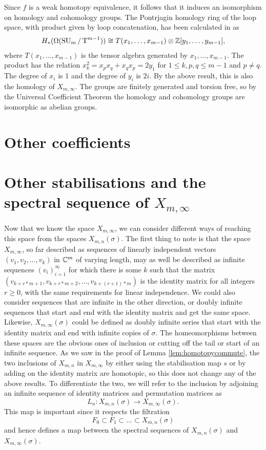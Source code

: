 Since $f$ is a weak homotopy equivalence, it follows that it induces
an isomorphism on homology and cohomology groups. The Pontrjagin
homology ring of the loop space, with product given by loop
concatenation, has been calculated in \cite[Theorem~4.1]{grbic} as
\begin{align*}
  H_*(\Omega(\operatorname{SU}_{m}/\operatorname{T}^{m-1})) \cong T(x_1,\dots,x_{m-1}) \otimes
  \mathbb{Z}[y_1,\dots,y_{m-1}],
\end{align*}
where $T(x_1,\dots,x_{m-1})$ is the tensor algebra generated by
$x_1,\dots,x_{m-1}$. The product has the relation $x_k^2 =
x_px_q+x_qx_p = 2y_1$ for $1\leq k,p,q\leq m-1$ and $p\neq q$. The
degree of $x_i$ is 1 and the degree of $y_i$
is $2i$. By the above result, this is also the homology of
$X_{m,\infty}$. The groups are finitely generated and torsion free, so
by the Universal Coefficient Theorem the homology and cohomology
groups are isomorphic as abelian groups.



\section{Other coefficients}
\label{sec:coef}


\section{Other stabilisations and the spectral sequence of
  $X_{m,\infty}$}

Now that we know the space $X_{m,\infty}$, we can consider different
ways of reaching this space from the spaces $X_{m,n}(\sigma)$. The
first thing to note is that the space $X_{m,\infty}$, so far described
as sequences of linearly independent vectors $(v_1,v_2,\dots,v_k)$ in
$\mathbb{C}^m$ of varying length, may as well be described as infinite
sequences $(v_i)_{i=1}^\infty$ for which there is some $k$ such that
the matrix $(v_{k+r*m +1},v_{k+r*m +2},\dots,v_{k+(r+1)*m})$ is the
identity matrix for all integers $r \geq 0$, with the same
requirements for
linear independence. We could also consider sequences that are
infinite in the other direction, or
doubly infinite sequences
that start and end with the identity matrix
and get the same space. Likewise, $X_{m,\infty}(\sigma)$ could be
defined as doubly infinite series that start with the identity matrix
and end with infinite copies of $\sigma$. The homeomorphisms between
these spaces are the obvious ones of inclusion or cutting off the tail
or start of an infinite sequence. As we saw in the proof of Lemma
\ref{lem:homotopycommute}, the two inclusions of $X_{m,n}$ in
$X_{m,\infty}$ by either
using the stabilisation map $s$ or by adding on the identity matrix
are homotopic, so this does not change any of the above results. To
differentiate the two, we will refer to the inclusion by adjoining an
infinite sequence of identity matrices and permutation matrices as
\[ L_n : X_{m,n}(\sigma) \to X_{m,\infty}(\sigma). \]
This map is important since it respects the
filtration 
\[ F_0 \subset F_1 \subset \dots \subset X_{m,n}(\sigma) \]
and hence defines a map between the spectral sequences of
$X_{m,n}(\sigma)$ and $X_{m,\infty}(\sigma)$.

